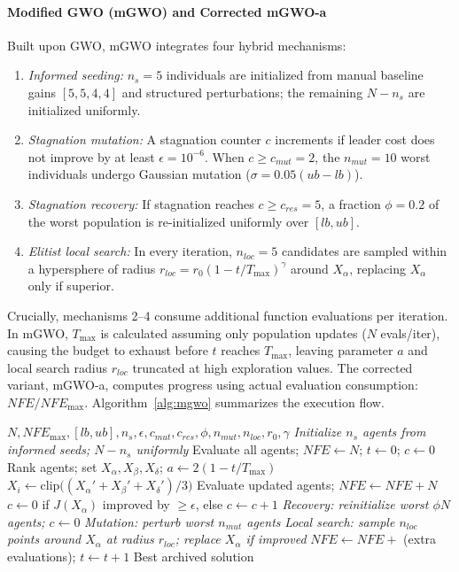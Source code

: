 \documentclass[a4paper,fleqn]{cas-dc}
\newcommand{\mgwo}{mGWO}
\newcommand{\mgwoa}{mGWO-a}
\begin{document}
\paragraph{Modified GWO (\mgwo{}) and Corrected \mgwoa{}} Built upon GWO, \mgwo{} integrates four hybrid mechanisms:
\begin{enumerate}
\item \emph{Informed seeding:} $n_s=5$ individuals are initialized from manual baseline gains $[5,5,4,4]$ and structured perturbations; the remaining $N-n_s$ are initialized uniformly.
\item \emph{Stagnation mutation:} A stagnation counter $c$ increments if leader cost does not improve by at least $\epsilon=10^{-6}$. When $c\ge c_{mut}=2$, the $n_{mut}=10$ worst individuals undergo Gaussian mutation ($\sigma=0.05(ub-lb)$).
\item \emph{Stagnation recovery:} If stagnation reaches $c\ge c_{res}=5$, a fraction $\phi=0.2$ of the worst population is re-initialized uniformly over $[lb,ub]$.
\item \emph{Elitist local search:} In every iteration, $n_{loc}=5$ candidates are sampled within a hypersphere of radius $r_{loc}=r_0(1-t/T_{\max})^\gamma$ around $X_\alpha$, replacing $X_\alpha$ only if superior.
\end{enumerate}
Crucially, mechanisms 2--4 consume additional function evaluations per iteration. In \mgwo{}, $T_{\max}$ is calculated assuming only population updates ($N$ evals/iter), causing the budget to exhaust before $t$ reaches $T_{\max}$, leaving parameter $a$ and local search radius $r_{loc}$ truncated at high exploration values. The corrected variant, \mgwoa{}, computes progress using actual evaluation consumption: $NFE/NFE_{\max}$. Algorithm~\ref{alg:mgwo} summarizes the execution flow.

\begin{algorithm}[t]
\caption{\mgwo{} (italicized text denotes added hybrid mechanisms)}
\label{alg:mgwo}
\begin{algorithmic}[1]
\REQUIRE $N, NFE_{\max}, [lb,ub], n_s, \epsilon, c_{mut}, c_{res}, \phi, n_{mut}, n_{loc}, r_0, \gamma$
\STATE \emph{Initialize $n_s$ agents from informed seeds; $N-n_s$ uniformly}
\STATE Evaluate all agents; $NFE\gets N$; $t\gets0$; $c\gets0$
\STATE Rank agents; set $X_\alpha, X_\beta, X_\delta$; $a\gets2(1-t/T_{\max})$
\STATE $X_i\gets\mathrm{clip}\bigl((X_\alpha'+X_\beta'+X_\delta')/3\bigr)$
\ENDFOR
\STATE Evaluate updated agents; $NFE\gets NFE+N$
\STATE $c\gets0$ if $J(X_\alpha)$ improved by $\ge\epsilon$, else $c\gets c+1$
\STATE \emph{Recovery: reinitialize worst $\phi N$ agents; $c\gets0$}
\STATE \emph{Mutation: perturb worst $n_{mut}$ agents}
\ENDIF
\STATE \emph{Local search: sample $n_{loc}$ points around $X_\alpha$ at radius $r_{loc}$; replace $X_\alpha$ if improved}
\STATE $NFE\gets NFE+$ (extra evaluations); $t\gets t+1$
\ENDWHILE
\RETURN Best archived solution
\end{algorithmic}
\end{algorithm}
\end{document}
